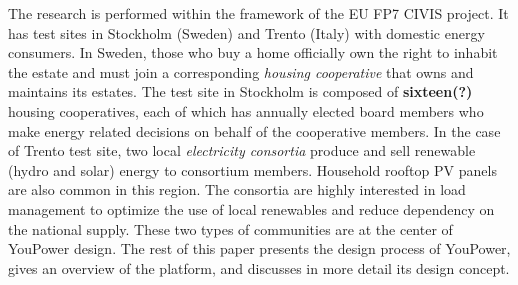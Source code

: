 The research is performed within the framework of the EU FP7 CIVIS project. It has test sites in Stockholm (Sweden) and Trento (Italy) with domestic energy consumers. 
% 
In Sweden, those who buy a home officially own the right to inhabit the estate and must join a corresponding \textit{housing cooperative} 
that owns and maintains its estates. The test site in Stockholm is composed of \textbf{sixteen(?)} housing cooperatives, each of which has annually elected board members who make energy related decisions on behalf of the cooperative members. 
In the case of Trento test site, two local \textit{electricity consortia} produce and sell renewable (hydro and solar) energy to consortium members. Household rooftop PV panels are also common in this region.  The consortia are highly interested in load management to optimize the use of local renewables and reduce dependency on the national supply. 
These two types of communities are at the center of YouPower design. 
% 
The rest of this paper presents the design process of YouPower, gives an overview of the platform, and discusses in more detail its design concept.

